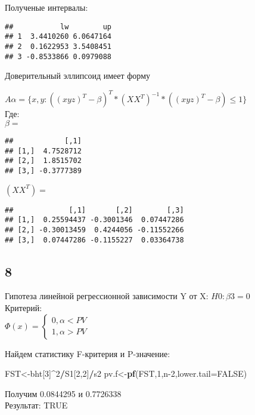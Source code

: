 \documentclass[]{article}
\newenvironment{Shaded}{\begin{snugshade}}{\end{snugshade}}
\newcommand{\DataTypeTok}[1]{\textcolor[rgb]{0.13,0.29,0.53}{#1}}
\newcommand{\DecValTok}[1]{\textcolor[rgb]{0.00,0.00,0.81}{#1}}
\newcommand{\KeywordTok}[1]{\textcolor[rgb]{0.13,0.29,0.53}{\textbf{#1}}}
\newcommand{\NormalTok}[1]{#1}
\newcommand{\OperatorTok}[1]{\textcolor[rgb]{0.81,0.36,0.00}{\textbf{#1}}}
\newcommand{\OtherTok}[1]{\textcolor[rgb]{0.56,0.35,0.01}{#1}}
\begin{document}
Полученые интервалы:

\begin{verbatim}
##           lw        up
## 1  3.4410260 6.0647164
## 2  0.1622953 3.5408451
## 3 -0.8533866 0.0979088
\end{verbatim}

Доверительный эллипсоид имеет форму

\(A\alpha=\{x,y:((xyz)^T-\beta)^T*(XX^T)^{-1}*((xyz)^T-\beta)\le 1\}\)\\
Где:\\
\(\beta=\)

\begin{verbatim}
##            [,1]
## [1,]  4.7528712
## [2,]  1.8515702
## [3,] -0.3777389
\end{verbatim}

\((XX^T)=\)

\begin{verbatim}
##             [,1]       [,2]        [,3]
## [1,]  0.25594437 -0.3001346  0.07447286
## [2,] -0.30013459  0.4244056 -0.11552266
## [3,]  0.07447286 -0.1155227  0.03364738
\end{verbatim}

\hypertarget{section-7}{%
\subsection{8}\label{section-7}}

Гипотеза линейной регрессионной зависимости Y от X: \(H0: \beta3=0\)\\
Критерий:\\
\(\Phi(x)=\begin{cases} 0, \alpha<PV \\ 1,\alpha>PV \end{cases}\)

Найдем статистику F-критерия и P-значение:

\begin{Shaded}
\begin{Highlighting}[]
\NormalTok{FST<-bht[}\DecValTok{3}\NormalTok{]}\OperatorTok{^}\DecValTok{2}\OperatorTok{/}\NormalTok{S1[}\DecValTok{2}\NormalTok{,}\DecValTok{2}\NormalTok{]}\OperatorTok{/}\NormalTok{s2}
\NormalTok{pv.f<-}\KeywordTok{pf}\NormalTok{(FST,}\DecValTok{1}\NormalTok{,n}\DecValTok{-2}\NormalTok{,}\DataTypeTok{lower.tail=}\OtherTok{FALSE}\NormalTok{)}
\end{Highlighting}
\end{Shaded}

Получим 0.0844295 и 0.7726338\\
Результат: TRUE
\end{document}
